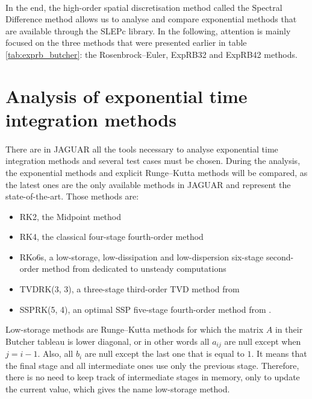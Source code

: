     \paragraph{}
    In the end, the high-order spatial discretisation method called the Spectral Difference method allows us to analyse and compare exponential methods that are available through the SLEPc library.
    In the following, attention is mainly focused on the three methods that were presented earlier in table \ref{tab:exprb_butcher}: the Rosenbrock--Euler, ExpRB32 and ExpRB42 methods.


  \section{Analysis of exponential time integration methods}

    \paragraph{}
    There are in JAGUAR all the tools necessary to analyse exponential time integration methods and several test cases must be chosen.
    During the analysis, the exponential methods and explicit Runge--Kutta methods will be compared, as the latest ones are the only available methods in JAGUAR and represent the state-of-the-art.
    Those methods are:
    \begin{itemize}
      \item RK2, the Midpoint method
      \item RK4, the classical four-stage fourth-order method
      \item RKo6s, a low-storage, low-dissipation and low-dispersion six-stage second-order method from \cite{BogeyBailly2004} dedicated to unsteady computations
      \item TVDRK(3, 3), a three-stage third-order TVD method from \cite{ShuOsher1988, GottliebShu1996}
      \item SSPRK(5, 4), an optimal SSP five-stage fourth-order method from \cite{SpiteriRuuth2002}.
    \end{itemize}
    Low-storage methods are Runge--Kutta methods for which the matrix $A$ in their Butcher tableau is lower diagonal, or in other words all $a_{ij}$ are null except when $j = i - 1$.
    Also, all $b_i$ are null except the last one that is equal to $1$.
    It means that the final stage and all intermediate ones use only the previous stage.
    Therefore, there is no need to keep track of intermediate stages in memory, only to update the current value, which gives the name low-storage method.
